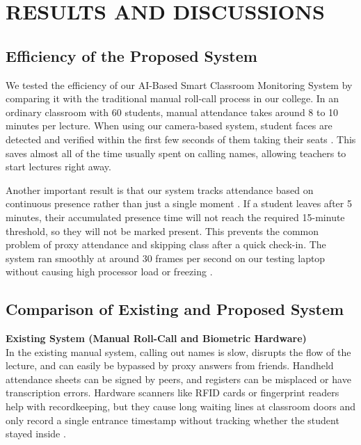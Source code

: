 \documentclass[10pt]{report}
\begin{document}
\chapter{RESULTS AND DISCUSSIONS}
\linespread{1.5}

\section{Efficiency of the Proposed System}
\hspace{0.5cm}We tested the efficiency of our AI-Based Smart Classroom Monitoring System by comparing it with the traditional manual roll-call process in our college. In an ordinary classroom with 60 students, manual attendance takes around 8 to 10 minutes per lecture. When using our camera-based system, student faces are detected and verified within the first few seconds of them taking their seats \cite{raj2024facial}. This saves almost all of the time usually spent on calling names, allowing teachers to start lectures right away.

\hspace{0.5cm}Another important result is that our system tracks attendance based on continuous presence rather than just a single moment \cite{rajesh2023smart}. If a student leaves after 5 minutes, their accumulated presence time will not reach the required 15-minute threshold, so they will not be marked present. This prevents the common problem of proxy attendance and skipping class after a quick check-in. The system ran smoothly at around 30 frames per second on our testing laptop without causing high processor load or freezing \cite{zhang2023realtime}.

\section{Comparison of Existing and Proposed System}
\noindent\textbf{Existing System (Manual Roll-Call and Biometric Hardware)}\\
In the existing manual system, calling out names is slow, disrupts the flow of the lecture, and can easily be bypassed by proxy answers from friends. Handheld attendance sheets can be signed by peers, and registers can be misplaced or have transcription errors. Hardware scanners like RFID cards or fingerprint readers help with recordkeeping, but they cause long waiting lines at classroom doors and only record a single entrance timestamp without tracking whether the student stayed inside \cite{rajesh2023smart}.\\
\end{document}
